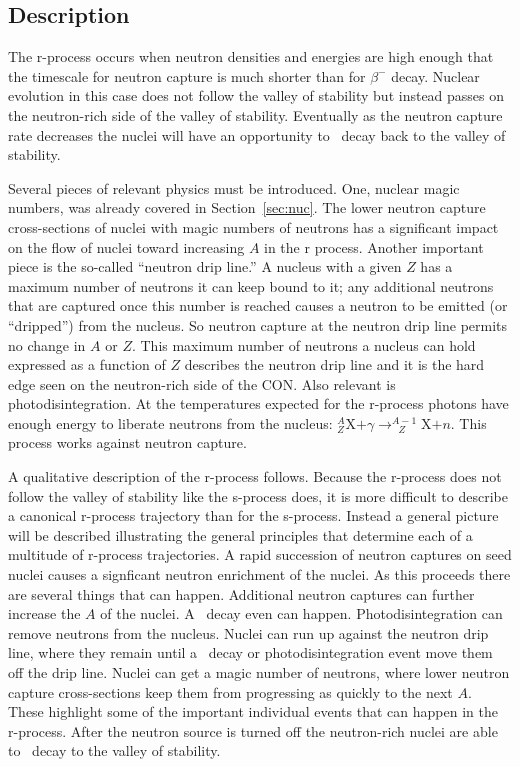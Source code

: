\label{sec:r}
\subsection{Description}

The r-process occurs when neutron
densities and energies are high enough that the timescale for
neutron capture is much shorter than for $\beta^-$ decay.  Nuclear
evolution in this case does not follow the valley of stability but
instead passes on the neutron-rich side of the valley of stability.
Eventually as the neutron capture rate decreases the nuclei will have
an opportunity to \bminus\ decay back to the valley of stability.

Several pieces of relevant physics must be introduced.  One, nuclear
magic numbers, was already covered in Section~\ref{sec:nuc}.  The
lower neutron capture cross-sections of nuclei with magic numbers of
neutrons has a significant impact on the flow of nuclei toward
increasing $A$ in the r process.  Another important piece 
 is the so-called
``neutron drip line.''  A nucleus with a given $Z$ has a maximum
number of neutrons it can keep bound to it; any additional neutrons
that are captured once this number is reached causes a neutron to be
emitted (or ``dripped'') from the nucleus.  So neutron capture at 
the neutron drip line permits no change in $A$ or $Z$.  
This maximum number of neutrons a nucleus can hold expressed as a
function of $Z$ describes the neutron drip line and it is the hard
edge seen on the neutron-rich side of the CON.  Also relevant is
photodisintegration.  At the temperatures expected for the r-process
photons have enough energy to liberate neutrons from the nucleus:
$^A_Z$X$+\gamma \rightarrow _{\ \ \ Z}^{A-1}$X$+n$.  This process
works against neutron capture.

A qualitative description of the r-process follows.  Because the 
r-process does not follow the valley of stability like the
s-process does, it is more difficult to describe a canonical r-process
trajectory than for the s-process.  Instead a general picture
will be described illustrating the general principles that determine
each of a multitude of r-process trajectories.  A
rapid succession of neutron captures on seed nuclei causes a
signficant neutron enrichment of the nuclei.  As this proceeds there
are several things that can happen.  Additional neutron captures can
further increase the $A$ of the nuclei.  A \bminus\ decay even can
happen. Photodisintegration can
remove neutrons from the nucleus.  Nuclei can run up against the
neutron drip line, where they remain until a \bminus\ decay or
photodisintegration event move them off the drip line.  Nuclei can
get a magic number of neutrons, where lower neutron capture
cross-sections keep them from progressing as quickly to the next $A$.
These highlight some of the important individual events that can
happen in the r-process. After the neutron source is turned off the 
neutron-rich nuclei are
able to \bminus\ decay to the valley of stability.  


